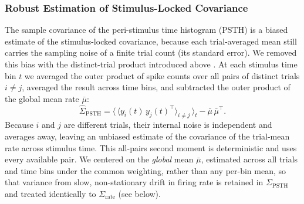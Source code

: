 \documentclass{lite}
\newcommand{\Cpsth}{\Sigma_{\text{PSTH}}}
\newcommand{\Crate}{\Sigma_{\text{rate}}}
\begin{document}
\subsubsection{Robust Estimation of Stimulus-Locked Covariance}
The sample covariance of the peri-stimulus time histogram (PSTH) is a biased estimate of the stimulus-locked covariance, because each trial-averaged mean still carries the sampling noise of a finite trial count (its standard error). We removed this bias with the distinct-trial product introduced above \parencite{sahani2003linear}. At each stimulus time bin $t$ we averaged the outer product of spike counts over all pairs of distinct trials $i \neq j$, averaged the result across time bins, and subtracted the outer product of the global mean rate $\bar{\mu}$:
\begin{equation}
    \hat{\Sigma}_{\text{PSTH}} = \big\langle\, \langle y_{i}(t)\, y_{j}(t)^\top \rangle_{i \neq j} \,\big\rangle_{t} - \bar{\mu}\,\bar{\mu}^\top .
\end{equation}
Because $i$ and $j$ are different trials, their internal noise is independent and averages away, leaving an unbiased estimate of the covariance of the trial-mean rate across stimulus time. This all-pairs second moment is deterministic and uses every available pair. We centered on the \textit{global} mean $\bar{\mu}$, estimated across all trials and time bins under the common weighting, rather than any per-bin mean, so that variance from slow, non-stationary drift in firing rate is retained in $\Cpsth$ and treated identically to $\Crate$ (see below). 
\end{document}
